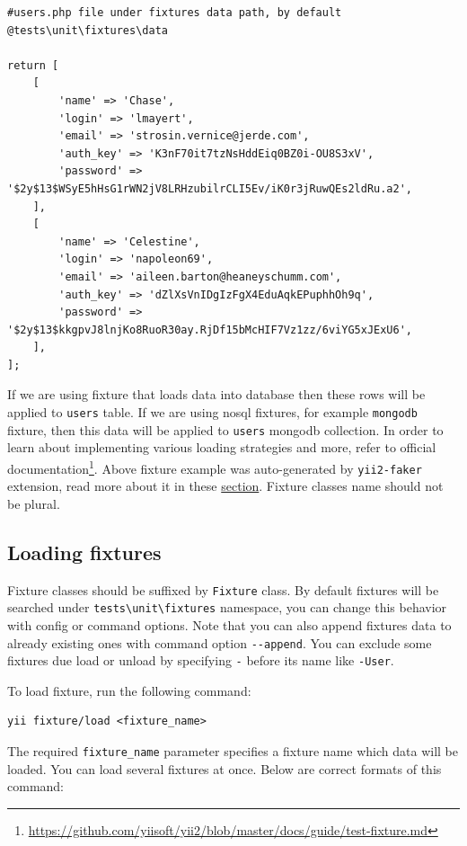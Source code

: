 \begin{lstlisting}
#users.php file under fixtures data path, by default @tests\unit\fixtures\data

return [
    [
        'name' => 'Chase',
        'login' => 'lmayert',
        'email' => 'strosin.vernice@jerde.com',
        'auth_key' => 'K3nF70it7tzNsHddEiq0BZ0i-OU8S3xV',
        'password' => '$2y$13$WSyE5hHsG1rWN2jV8LRHzubilrCLI5Ev/iK0r3jRuwQEs2ldRu.a2',
    ],
    [
        'name' => 'Celestine',
        'login' => 'napoleon69',
        'email' => 'aileen.barton@heaneyschumm.com',
        'auth_key' => 'dZlXsVnIDgIzFgX4EduAqkEPuphhOh9q',
        'password' => '$2y$13$kkgpvJ8lnjKo8RuoR30ay.RjDf15bMcHIF7Vz1zz/6viYG5xJExU6',
    ],
];
\end{lstlisting}
If we are using fixture that loads data into database then these rows will be applied to \lstinline|users| table. If we are using nosql fixtures, for example \lstinline|mongodb|
fixture, then this data will be applied to \lstinline|users| mongodb collection. In order to learn about implementing various loading strategies and more, refer to official documentation\footnote{\url{https://github.com/yiisoft/yii2/blob/master/docs/guide/test-fixture.md}}.
Above fixture example was auto-generated by \lstinline|yii2-faker| extension, read more about it in these \hyperref[test-fixtures.md::::auto-generating-fixtures]{section}.
Fixture classes name should not be plural.

\subsection{Loading fixtures}
Fixture classes should be suffixed by \lstinline|Fixture| class. By default fixtures will be searched under \lstinline|tests\unit\fixtures| namespace, you can
change this behavior with config or command options. Note that you can also append fixtures data to already existing ones with command
option \lstinline|--append|. You can exclude some fixtures due load or unload by specifying \lstinline|-| before its name like \lstinline|-User|.

To load fixture, run the following command:

\begin{lstlisting}
yii fixture/load <fixture_name>
\end{lstlisting}
The required \lstinline|fixture_name| parameter specifies a fixture name which data will be loaded. You can load several fixtures at once.
Below are correct formats of this command:

